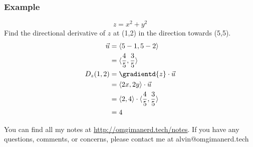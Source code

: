 \documentclass[letterpaper, 12pt]{math}
\begin{document}
\subsubsection*{Example}
\[ z = x^2+y^2 \]
Find the directional derivative of \( z \) at (1,2) in the direction towards
(5,5).
\begin{align*}
  \vec{u} &= \langle5-1,5-2\rangle \\
  &= \langle\frac{4}{5},\frac{3}{5}\rangle \\
  D_z(1,2) &= \gradientd{z}\cdot\vec{u} \\
  &= \langle2x,2y\rangle\cdot\vec{u} \\
  &= \langle2,4\rangle\cdot\langle\frac{4}{5},\frac{3}{5}\rangle \\
  &= 4
\end{align*}

\begin{center}
  You can find all my notes at \url{http://omgimanerd.tech/notes}. If you have
  any questions, comments, or concerns, please contact me at
  alvin@omgimanerd.tech
\end{center}
\end{document}
